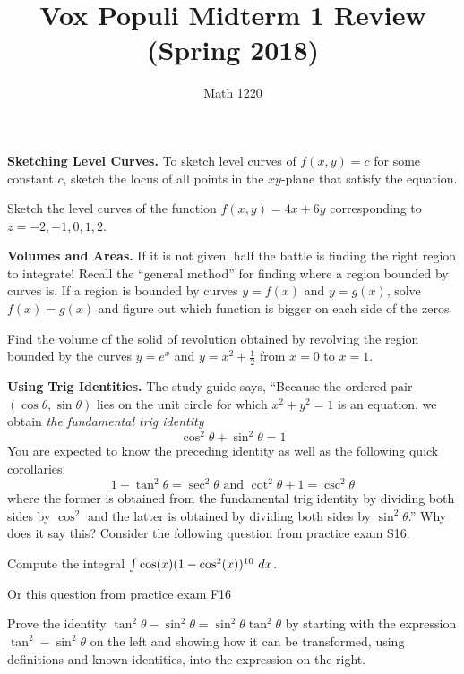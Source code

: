 \documentclass[12pt, a4paper]{article}
\author{Math 1220}
\title{Vox Populi Midterm 1 Review (Spring 2018)}
\date{}
\begin{document}
\maketitle
\vspace{-0.3in}
\textbf{Sketching Level Curves.} To sketch level curves of \(f(x,y) =
c\) for some constant \(c\), sketch the locus of all points in the
\(xy\)-plane that satisfy the equation.
\begin{ex}
  Sketch the level curves of the function \(f(x,y) = 4x+6y\)
  corresponding to \(z = -2, -1, 0, 1, 2\).
\end{ex}
\textbf{Volumes and Areas.} If it is not given, half the battle is
finding the right region to integrate! Recall the ``general method''
for finding where a region bounded by curves is. If a region is
bounded by curves \(y = f(x)\) and \(y = g(x)\), solve \(f(x) = g(x)\)
and figure out which function is bigger on each side of the zeros.
\begin{ex}
  Find the volume of the solid of revolution obtained by revolving the
  region bounded by the curves \(y=e^x\) and \(y=x^2+\frac{1}{2}\)
  from \(x=0\) to \(x=1\).
\end{ex}
\textbf{Using Trig Identities.} The study guide says, ``Because the
ordered pair \((\cos \theta, \sin \theta)\) lies on the unit circle
for which \(x^2+y^2=1\) is an equation, we obtain \emph{the
  fundamental trig identity} \[
  \cos^2 \theta + \sin^2 \theta = 1
\]
You are expected to know the preceding identity as well as the
following quick corollaries:\[
  1+\tan^2 \theta = \sec^2 \theta \text{ and } \cot^2 \theta + 1 =
  \csc^2 \theta
\]
where the former is obtained from the fundamental trig identity by
dividing both sides by \(\cos^2\) and the latter is obtained by
dividing both sides by \(\sin^2 \theta\).'' Why does it say this?
Consider the following question from practice exam S16.
\begin{ex}
  Compute the integral \(\int \cos(x)(1 - \cos^2(x))^{10} \ d x\).
\end{ex}
Or this question from practice exam F16
\begin{ex}
  Prove the identity \(\tan^2 \theta - \sin^2 \theta = \sin^2 \theta
  \tan^2 \theta\) by starting with the expression \(\tan^2 - \sin^2
  \theta\) on the left and showing how it can be transformed, using
  definitions and known identities, into the expression on the right. 
\end{ex}
\end{document}
